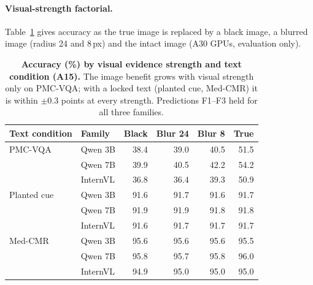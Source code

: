 \paragraph{Visual-strength factorial.}
Table~\ref{tab:a15f} gives accuracy as the true image is replaced by a black image, a blurred image (radius 24 and 8\,px) and the intact image (A30 GPUs, evaluation only).

\begin{table}[h]
  \centering
  \footnotesize
  \setlength{\tabcolsep}{2.2pt}
  \begin{tabular}{@{}llrrrr@{}}
    \toprule
    Text condition & Family & Black & Blur 24 & Blur 8 & True \\
    \midrule
    PMC-VQA & Qwen 3B & 38.4 & 39.0 & 40.5 & 51.5 \\
            & Qwen 7B & 39.9 & 40.5 & 42.2 & 54.2 \\
            & InternVL & 36.8 & 36.4 & 39.3 & 50.9 \\
    Planted cue & Qwen 3B & 91.6 & 91.7 & 91.6 & 91.7 \\
            & Qwen 7B & 91.9 & 91.9 & 91.8 & 91.8 \\
            & InternVL & 91.6 & 91.7 & 91.7 & 91.7 \\
    Med-CMR & Qwen 3B & 95.6 & 95.6 & 95.6 & 95.5 \\
            & Qwen 7B & 95.8 & 95.7 & 95.8 & 96.0 \\
            & InternVL & 94.9 & 95.0 & 95.0 & 95.0 \\
    \bottomrule
  \end{tabular}
  \caption{\textbf{Accuracy (\%) by visual evidence strength and text condition (A15).} The image benefit grows with visual strength only on PMC-VQA; with a locked text (planted cue, Med-CMR) it is within $\pm0.3$ points at every strength. Predictions F1--F3 held for all three families.}
  \label{tab:a15f}
\end{table}
